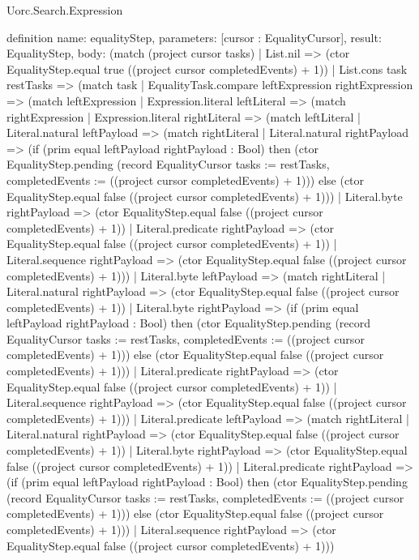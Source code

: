 \begin{lexlean}{Uorc.Search.Expression}
\begin{semanticmodule}
definition{
  name: equalityStep,
  parameters: [cursor : EqualityCursor],
  result: EqualityStep,
  body: (match (project cursor tasks)
    | List.nil => (ctor EqualityStep.equal true ((project cursor completedEvents) + 1))
    | List.cons task restTasks => (match task
      | EqualityTask.compare leftExpression rightExpression => (match leftExpression
        | Expression.literal leftLiteral => (match rightExpression
          | Expression.literal rightLiteral => (match leftLiteral
            | Literal.natural leftPayload => (match rightLiteral
              | Literal.natural rightPayload => (if (prim equal leftPayload rightPayload : Bool) then (ctor EqualityStep.pending (record EqualityCursor {tasks := restTasks, completedEvents := ((project cursor completedEvents) + 1)})) else (ctor EqualityStep.equal false ((project cursor completedEvents) + 1)))
              | Literal.byte rightPayload => (ctor EqualityStep.equal false ((project cursor completedEvents) + 1))
              | Literal.predicate rightPayload => (ctor EqualityStep.equal false ((project cursor completedEvents) + 1))
              | Literal.sequence rightPayload => (ctor EqualityStep.equal false ((project cursor completedEvents) + 1)))
            | Literal.byte leftPayload => (match rightLiteral
              | Literal.natural rightPayload => (ctor EqualityStep.equal false ((project cursor completedEvents) + 1))
              | Literal.byte rightPayload => (if (prim equal leftPayload rightPayload : Bool) then (ctor EqualityStep.pending (record EqualityCursor {tasks := restTasks, completedEvents := ((project cursor completedEvents) + 1)})) else (ctor EqualityStep.equal false ((project cursor completedEvents) + 1)))
              | Literal.predicate rightPayload => (ctor EqualityStep.equal false ((project cursor completedEvents) + 1))
              | Literal.sequence rightPayload => (ctor EqualityStep.equal false ((project cursor completedEvents) + 1)))
            | Literal.predicate leftPayload => (match rightLiteral
              | Literal.natural rightPayload => (ctor EqualityStep.equal false ((project cursor completedEvents) + 1))
              | Literal.byte rightPayload => (ctor EqualityStep.equal false ((project cursor completedEvents) + 1))
              | Literal.predicate rightPayload => (if (prim equal leftPayload rightPayload : Bool) then (ctor EqualityStep.pending (record EqualityCursor {tasks := restTasks, completedEvents := ((project cursor completedEvents) + 1)})) else (ctor EqualityStep.equal false ((project cursor completedEvents) + 1)))
              | Literal.sequence rightPayload => (ctor EqualityStep.equal false ((project cursor completedEvents) + 1)))
}
\end{semanticmodule}
\end{lexlean}
